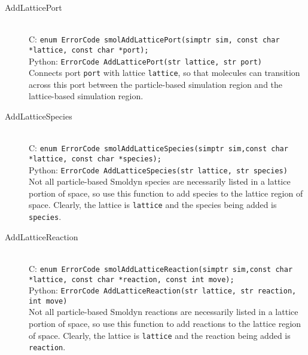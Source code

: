 \documentclass {book}
\begin{document}
\begin{description}
\item[AddLatticePort]
\hfill \\
C: \texttt{enum ErrorCode smolAddLatticePort(simptr sim, const char *lattice, const char *port);}\\
Python: \texttt{ErrorCode AddLatticePort(str lattice, str port)}\\
Connects port \texttt{port} with lattice \texttt{lattice}, so that molecules can transition across this port between the particle-based simulation region and the lattice-based simulation region.

\item[AddLatticeSpecies]
\hfill \\
C: \texttt{enum ErrorCode smolAddLatticeSpecies(simptr sim,const char *lattice, const char *species);}\\
Python: \texttt{ErrorCode AddLatticeSpecies(str lattice, str species)}\\
Not all particle-based Smoldyn species are necessarily listed in a lattice portion of space, so use this function to add species to the lattice region of space. Clearly, the lattice is \texttt{lattice} and the species being added is \texttt{species}.

\item[AddLatticeReaction]
\hfill \\
C: \texttt{enum ErrorCode smolAddLatticeReaction(simptr sim,const char *lattice, const char *reaction, const int move);}\\
Python: \texttt{ErrorCode AddLatticeReaction(str lattice, str reaction, int move)}\\
Not all particle-based Smoldyn reactions are necessarily listed in a lattice portion of space, so use this function to add reactions to the lattice region of space. Clearly, the lattice is \texttt{lattice} and the reaction being added is \texttt{reaction}.

\end{description}
\end{document}
